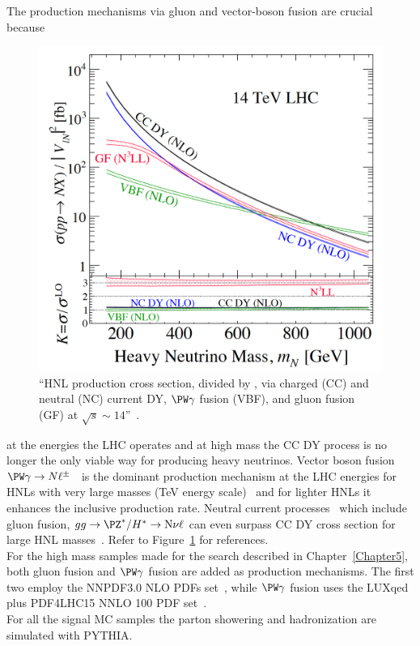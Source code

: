 The production mechanisms via gluon and vector-boson fusion are
crucial because
\begin{figure}
  \includegraphics[clip,trim=0cm 0cm 0.5cm 0.5cm, width=.39\textwidth]{Figures/c4/hnl_lhc_production}
  \caption{``HNL production cross section, divided by \mixpar, via
charged (CC) and neutral (NC) current DY, $\PW \gamma$ fusion (VBF),
and gluon fusion (GF) at $\sqrt{s}
\sim 14$\TeV ''~\cite{Pascoli_2019}.}
  \label{fig:hnl_lhc_graph}
\end{figure} 
 at the energies the LHC operates and at high \hnl mass the CC DY process
is no longer the only viable way for producing heavy neutrinos. 
Vector boson fusion $\PW \gamma \rightarrow N
\ell^{\pm}$~\cite{PhysRevLett.112.081801, Alva:2014gxa,Degrande_2016}
is the dominant production mechanism at the LHC 
energies for HNLs with very large masses
(TeV energy scale)~\cite{Alva:2014gxa,Degrande_2016, Pascoli_2019} and for
lighter HNLs it enhances the inclusive production rate. Neutral current
processes~\cite{PhysRevD.44.1593,WILLENBROCK1985429} which include
gluon fusion, $gg \rightarrow \PZ^{*}/H^{*} \rightarrow \hnl \nu \ell$
can even surpass CC DY cross section for large HNL masses~\cite{PhysRevD.96.055042,
  Pascoli_2019}. Refer to Figure~\ref{fig:hnl_lhc_graph} for
references.\\
For the high mass \hnl samples made for the search described in
Chapter~\ref{Chapter5}, both gluon
fusion and $\PW \gamma$
fusion are added as production mechanisms. 
The first two employ
the NNPDF3.0 NLO PDFs set~\cite{Ball_2015}, while $\PW \gamma$
fusion uses the LUXqed plus PDF4LHC15 NNLO 100
PDF set~\cite{PhysRevLett.117.242002}.\\
For all the signal MC samples the parton showering and hadronization are simulated with PYTHIA. \\

